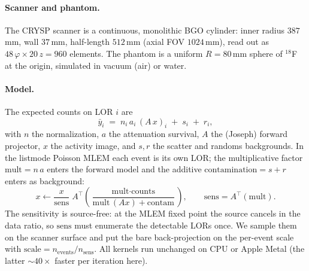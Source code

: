 \documentclass[11pt]{article}
\begin{document}
\paragraph{Scanner and phantom.} The CRYSP scanner is a continuous, monolithic BGO
cylinder: inner radius $387$\,mm, wall $37$\,mm, half-length $512$\,mm (axial FOV
$1024$\,mm), read out as $48\,\varphi\times 20\,z = 960$ elements. The phantom is a
uniform $R=80$\,mm sphere of $^{18}$F at the origin, simulated in vacuum (air) or
water.

\paragraph{Model.} The expected counts on LOR $i$ are
\begin{equation}
  \bar y_i \;=\; n_i\,a_i\,(A\,x)_i \;+\; s_i \;+\; r_i,
  \label{eq:model}
\end{equation}
with $n$ the normalization, $a$ the attenuation survival, $A$ the (Joseph) forward
projector, $x$ the activity image, and $s,r$ the scatter and randoms backgrounds.
In the listmode Poisson MLEM each event is its own LOR; the multiplicative factor
$\text{mult}=n\,a$ enters the forward model and the additive $\text{contamination}=s+r$
enters as background:
\begin{equation}
  x \leftarrow \frac{x}{\text{sens}}\;A^{\!\top}\!\!\left(\frac{\text{mult}\cdot\text{counts}}{\text{mult}\,(Ax)+\text{contam}}\right),
  \qquad
  \text{sens}=A^{\!\top}(\text{mult}).
  \label{eq:mlem}
\end{equation}
The sensitivity is source-free: at the MLEM fixed point the source cancels in the
data ratio, so $\text{sens}$ must enumerate the detectable LORs once. We sample them
on the scanner surface and put the bare back-projection on the per-event scale with
$\text{scale}=n_{\text{events}}/n_{\text{sens}}$. All kernels run unchanged on CPU
or Apple Metal (the latter $\sim\!40\times$ faster per iteration here).
\end{document}
